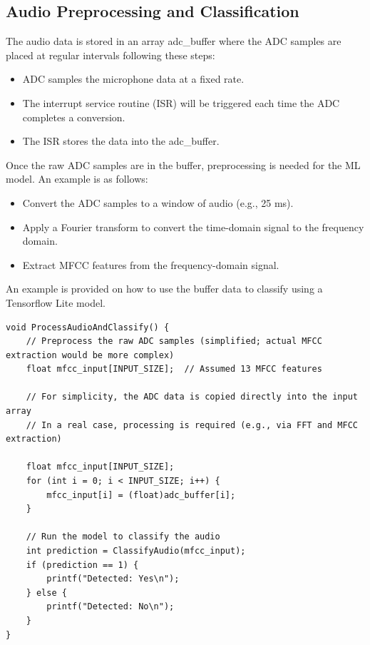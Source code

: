 \documentclass[
  9pt,
  letterpaper,
  abstract,
  titlepage]{scrbook}
\begin{document}
\subsection{Audio Preprocessing and
Classification}\label{audio-preprocessing-and-classification}

The audio data is stored in an array adc\_buffer where the ADC samples
are placed at regular intervals following these steps:

\begin{itemize}
\item
  ADC samples the microphone data at a fixed rate.
\item
  The interrupt service routine (ISR) will be triggered each time the
  ADC completes a conversion.
\item
  The ISR stores the data into the adc\_buffer.
\end{itemize}

Once the raw ADC samples are in the buffer, preprocessing is needed for
the ML model. An example is as follows:

\begin{itemize}
\item
  Convert the ADC samples to a window of audio (e.g., 25 ms).
\item
  Apply a Fourier transform to convert the time-domain signal to the
  frequency domain.
\item
  Extract MFCC features from the frequency-domain signal.
\end{itemize}

An example is provided on how to use the buffer data to classify using a
Tensorflow Lite model.

\begin{verbatim}
void ProcessAudioAndClassify() {
    // Preprocess the raw ADC samples (simplified; actual MFCC extraction would be more complex)
    float mfcc_input[INPUT_SIZE];  // Assumed 13 MFCC features
    
    // For simplicity, the ADC data is copied directly into the input array
    // In a real case, processing is required (e.g., via FFT and MFCC extraction)

    float mfcc_input[INPUT_SIZE];
    for (int i = 0; i < INPUT_SIZE; i++) {
        mfcc_input[i] = (float)adc_buffer[i];
    }

    // Run the model to classify the audio
    int prediction = ClassifyAudio(mfcc_input);
    if (prediction == 1) {
        printf("Detected: Yes\n");
    } else {
        printf("Detected: No\n");
    }
}
\end{verbatim}
\end{document}
